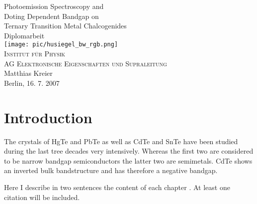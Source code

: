 \documentclass[12pt,oneside,english]{book}
\newcommand{\noun}[1]{\textsc{#1}}
\begin{document}
\frontmatter
{}
\begin{titlepage}
\begin{center}
\vspace*{20mm}
{\Huge
Photoemission Spectroscopy and\\
Doting Dependent Bandgap on \\[3mm]
Ternary Transition Metal Chalcogenides}\\[15mm]
{\Large Diplomarbeit}\\[25mm]
\texttt{[image: pic/husiegel\_bw\_rgb.png]}\\[30mm]
\noun{\large
Institut für Physik\\
AG Elektronische Eigenschaften und Supraleitung}\\[15mm]
{\large
Matthias Kreier\\[15mm]
Berlin, 16. 7. 2007}
\end{center}
\end{titlepage}

\tableofcontents{}

\mainmatter

\chapter{Introduction}

The crystals of HgTe and PbTe as well as CdTe and SnTe have been studied
during the last tree decades very intensively. Whereas the first two
are considered to be narrow bandgap semiconductors the latter two
are semimetals. CdTe shows an inverted bulk bandstructure and has
therefore a negative bandgap.

Here I describe in two sentences the content of each chapter \cite{theorie1}.
At least one citation will be included.
\end{document}

